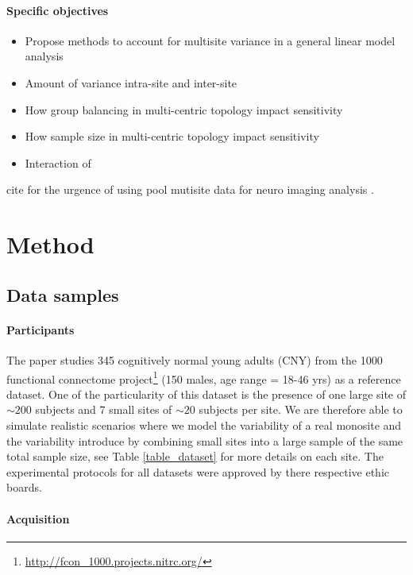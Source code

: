 \documentclass[authoryear]{elsarticle}
\begin{document}
\paragraph{Specific objectives} 

\begin{itemize}
 \item Propose methods to account for multisite variance in a general linear model analysis
 \item Amount of variance intra-site and inter-site
 \item How group balancing in multi-centric topology impact sensitivity
 \item How sample size in multi-centric topology impact sensitivity
 \item Interaction of 
\end{itemize}


cite for the urgence of using pool mutisite data for neuro imaging analysis \cite{Cheng2015}.


\section{Method}

\subsection{Data samples} 

\paragraph{Participants}
The paper studies 345 cognitively normal young adults (CNY) from the 1000 functional connectome project\footnote{\url{http://fcon_1000.projects.nitrc.org/}} (150 males, age range = 18-46 yrs) as a reference dataset. One of the particularity of this dataset is the presence of one large site of $\sim200$ subjects and 7 small sites of $\sim20$ subjects per site. We are therefore able to simulate realistic scenarios where we model the variability of a real monosite and the variability introduce by combining small sites into a large sample of the same total sample size, see Table \ref{table_dataset} for more details on each site. The experimental protocols for all datasets were approved by there respective ethic boards.

\paragraph{Acquisition} %
\end{document}
